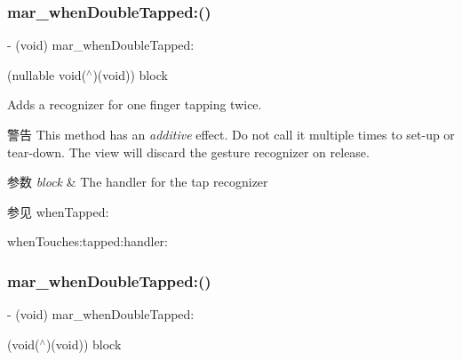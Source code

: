 \subsubsection{\texorpdfstring{mar\+\_\+when\+Double\+Tapped\+:()}{mar\_whenDoubleTapped:()}\hspace{0.1cm}{\footnotesize\ttfamily [1/2]}}
{\footnotesize\ttfamily -\/ (void) mar\+\_\+when\+Double\+Tapped\+: \begin{DoxyParamCaption}\item[{(nullable void($^\wedge$)(void))}]{block }\end{DoxyParamCaption}}

Adds a recognizer for one finger tapping twice.

\begin{DoxyWarning}{警告}
This method has an {\itshape additive} effect. Do not call it multiple times to set-\/up or tear-\/down. The view will discard the gesture recognizer on release.
\end{DoxyWarning}

\begin{DoxyParams}{参数}
{\em block} & The handler for the tap recognizer \\
\hline
\end{DoxyParams}
\begin{DoxySeeAlso}{参见}
when\+Tapped\+: 

when\+Touches\+:tapped\+:handler\+: 
\end{DoxySeeAlso}
\mbox{\label{category_u_i_view_07_m_a_r_e_x___gesture_block_08_ac87dd422ab8e224e31699808641785cb}} 
\subsubsection{\texorpdfstring{mar\+\_\+when\+Double\+Tapped\+:()}{mar\_whenDoubleTapped:()}\hspace{0.1cm}{\footnotesize\ttfamily [2/2]}}
{\footnotesize\ttfamily -\/ (void) mar\+\_\+when\+Double\+Tapped\+: \begin{DoxyParamCaption}\item[{(void($^\wedge$)(void))}]{block }\end{DoxyParamCaption}\hspace{0.3cm}{\ttfamily [implementation]}}

